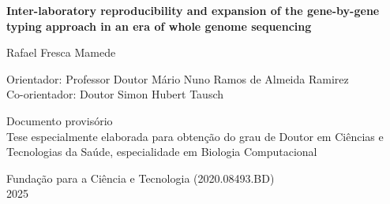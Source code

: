 \begin{titlepage}
\begin{center}
        \vspace{1cm}

        \huge
        \textbf{Inter-laboratory reproducibility and expansion of the gene-by-gene typing approach in an era of whole genome sequencing}
        \normalsize
        
        \vspace{1cm}
        
        \large
        Rafael Fresca Mamede
        \normalsize
        
        \vspace{1cm}
        
        Orientador: Professor Doutor Mário Nuno Ramos de Almeida Ramirez\\
        Co-orientador: Doutor Simon Hubert Tausch
        
        \vfill

        Documento provisório \\
        Tese especialmente elaborada para obtenção do grau de Doutor em Ciências e Tecnologias da Saúde, especialidade em Biologia Computacional\\
        
        \vspace{0.8cm}



    \begin{center}
        \normalsize
        Fundação para a Ciência e Tecnologia (2020.08493.BD)\\        
        2025
    \end{center}
        
    \end{center}
\end{titlepage}